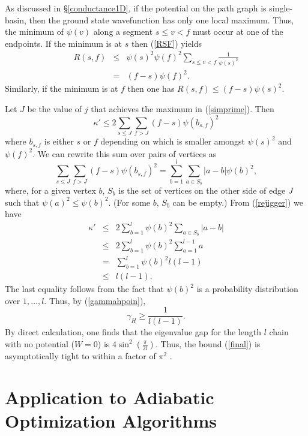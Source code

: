 As discussed in \S \ref{conductance1D}, if the potential on the
path graph is single-basin, then the ground state wavefunction has only one
local maximum. Thus, the minimum of $\psi(v)$ along a segment $s \leq
v < f$ must occur at one of the endpoints. If the minimum is at $s$
then (\ref{RSF}) yields
\begin{eqnarray}
R(s,f) & \leq & \psi(s)^2 \psi(f)^2 \sum_{s \leq v < f}
\frac{1}{\psi(s)^2} \\
& = & (f-s) \psi(f)^2.
\end{eqnarray}
Similarly, if the minimum is at $f$ then one has $R(s,f) \leq (f-s)
\psi(s)^2$.

Let $J$ be the value of $j$ that achieves the maximum in
(\ref{simprime}). Then
\begin{equation}
\kappa' \leq 2 \sum_{s \leq J} \sum_{f > J}  (f-s) \psi(b_{s,f})^2
\end{equation}
where $b_{s,f}$ is either $s$ or $f$ depending on which is smaller amongst
$\psi(s)^2$ and $\psi(f)^2$. We can rewrite this sum over pairs of
vertices as
\begin{equation}
\label{rejigger}
\sum_{s \leq J} \sum_{f > J}  (f-s) \psi(b_{s,f})^2 = \sum_{b=1}^l
\sum_{a \in S_b} |a-b| \psi(b)^2,
\end{equation}
where, for a given vertex $b$, $S_b$ is the set of
vertices on the other side of edge $J$ such that $\psi(a)^2 \leq
\psi(b)^2$. (For some $b$, $S_b$ can be empty.) From (\ref{rejigger})
we have
\begin{eqnarray}
\kappa' & \leq & 2 \sum_{b=1}^l \psi(b)^2 \sum_{a \in S_b} |a-b| \\
        & \leq & 2 \sum_{b=1}^l \psi(b)^2 \sum_{a=1}^{l-1} a \\
        & =    & \sum_{b=1}^l \psi(b)^2 l(l-1) \\
        & \leq & l (l-1).
\end{eqnarray}
The last equality follows from the fact that $\psi(b)^2$ is a
probability distribution over $1,\ldots,l$. Thus, by
(\ref{gammahpoin}),
\begin{equation}
\label{final}
\gamma_H \geq \frac{1}{l(l-1)}.
\end{equation}
By direct calculation, one finds that the eigenvalue gap for the
length $l$ chain with no potential ($W=0$) is $4 \sin^2 \left(
  \frac{\pi}{2 l} \right)$. Thus, the bound (\ref{final}) is
asymptotically tight to within a factor of $\pi^2$
\cite{Jarret2014c}.

\section{Application to Adiabatic Optimization Algorithms}
\label{aqc}

